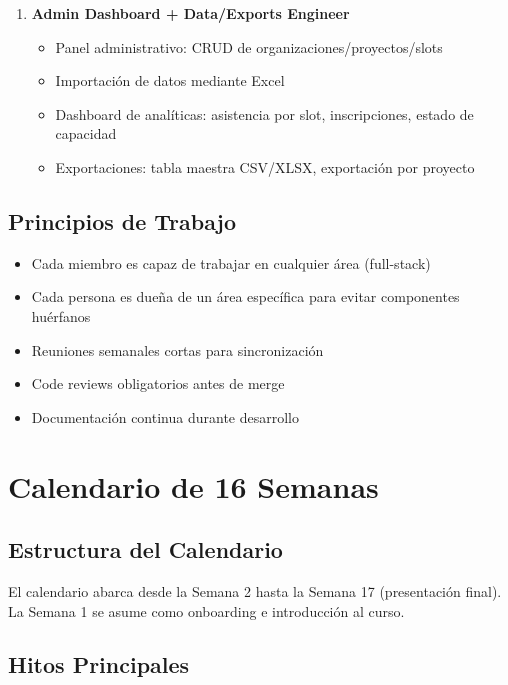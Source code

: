 \documentclass[12pt,a4paper]{article}
\begin{document}
\begin{enumerate}
    \item \textbf{Admin Dashboard + Data/Exports Engineer}
    \begin{itemize}[leftmargin=*]
        \item Panel administrativo: CRUD de organizaciones/proyectos/slots
        \item Importación de datos mediante Excel
        \item Dashboard de analíticas: asistencia por slot, inscripciones, estado de capacidad
        \item Exportaciones: tabla maestra CSV/XLSX, exportación por proyecto
    \end{itemize}
\end{enumerate}

\subsection{Principios de Trabajo}

\begin{itemize}[leftmargin=*]
    \item Cada miembro es capaz de trabajar en cualquier área (full-stack)
    \item Cada persona es dueña de un área específica para evitar componentes huérfanos
    \item Reuniones semanales cortas para sincronización
    \item Code reviews obligatorios antes de merge
    \item Documentación continua durante desarrollo
\end{itemize}

\section{Calendario de 16 Semanas}

\subsection{Estructura del Calendario}

El calendario abarca desde la Semana 2 hasta la Semana 17 (presentación final). La Semana 1 se asume como onboarding e introducción al curso.

\subsection{Hitos Principales}
\end{document}
